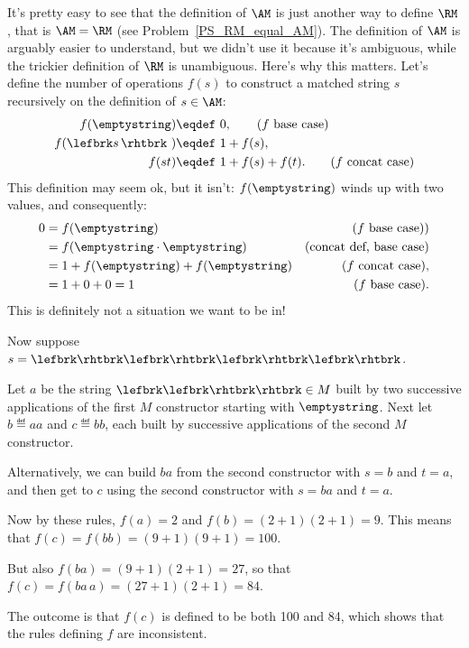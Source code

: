 It's pretty easy to see that the definition of $\AM$ is just another way
to define $\RM$, that is $\AM = \RM$ (see Problem~\ref{PS_RM_equal_AM}).
The definition of $\AM$ is arguably easier to understand, but we didn't
use it because it's ambiguous, while the trickier definition of $\RM$ is
unambiguous.  Here's why this matters.  Let's define the number of
operations $f(s)$ to construct a matched string $s$ recursively on the
definition of $s \in \AM$:
\begin{align*}
  f(\emptystring)        & \eqdef\ 0, \tag{$f$ base case}\\
  f(\lefbrk s\,\rhtbrk\ ) & \eqdef\ 1+ f(s), \\
  f(st)                  & \eqdef\ 1+ f(s) +f(t).\tag{$f$ concat case}
\end{align*}
This definition may seem ok, but it isn't:
$f(\emptystring)$ winds up with two values, and consequently:
\begin{align*}
0 & = f(\emptystring) & \text{($f$ base case))}\\
  & = f(\emptystring \cdot \emptystring) & \text{(concat def, base case)} \\
                & = 1 + f(\emptystring) + f(\emptystring)
                      &  \text{($f$ concat case)},\\
                & = 1 + 0 + 0 = 1
                      & \text{($f$ base case)}.
\end{align*}
This is definitely not a situation we want to be in!


\iffalse

Now suppose $s = \lefbrk\rhtbrk\lefbrk\rhtbrk\lefbrk\rhtbrk\lefbrk\rhtbrk$.



Let $a$ be the string $\lefbrk\lefbrk\rhtbrk\rhtbrk \in M$ built by two successive
applications of the first $M$ constructor starting with $\emptystring$.  Next
let $b \eqdef aa$ and $c \eqdef bb$, each built by successive applications
of the second $M$ constructor.

Alternatively, we can build $ba$ from the second constructor with $s=b$
and $t=a$, and then get to $c$ using the second constructor with $s=ba$
and $t=a$.

Now by these rules, $f(a) = 2$ and $f(b) = (2+1)(2+1)=9$.  This means
that $f(c) = f(bb)= (9+1)(9+1)=100$.

But also $f(ba) = (9+1)(2+1) = 27$, so that $f(c) = f(ba\,a) = (27 +1)
(2+1) = 84$.

The outcome is that $f(c)$ is defined to be both 100 and 84, which shows
that the rules defining $f$ are inconsistent.

